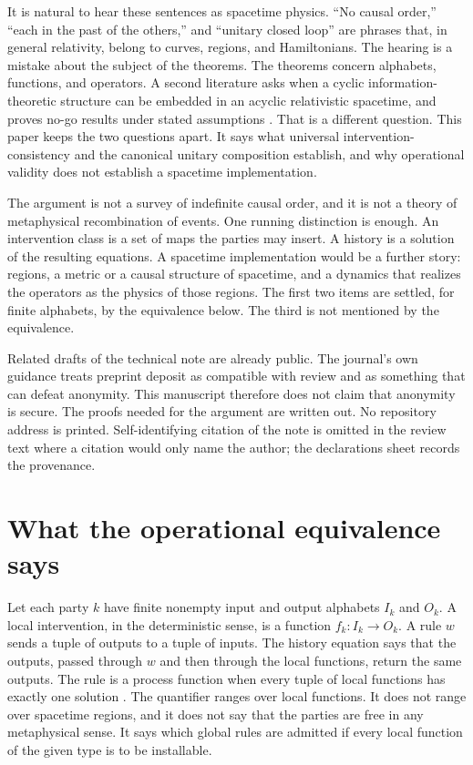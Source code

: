 \documentclass[11pt]{article}
\begin{document}
It is natural to hear these sentences as spacetime physics. ``No causal order,'' ``each in the past of the others,'' and ``unitary closed loop'' are phrases that, in general relativity, belong to curves, regions, and Hamiltonians. The hearing is a mistake about the subject of the theorems. The theorems concern alphabets, functions, and operators. A second literature asks when a cyclic information-theoretic structure can be embedded in an acyclic relativistic spacetime, and proves no-go results under stated assumptions \citep{vilasini2024}. That is a different question. This paper keeps the two questions apart. It says what universal intervention-consistency and the canonical unitary composition establish, and why operational validity does not establish a spacetime implementation.

The argument is not a survey of indefinite causal order, and it is not a theory of metaphysical recombination of events. One running distinction is enough. An intervention class is a set of maps the parties may insert. A history is a solution of the resulting equations. A spacetime implementation would be a further story: regions, a metric or a causal structure of spacetime, and a dynamics that realizes the operators as the physics of those regions. The first two items are settled, for finite alphabets, by the equivalence below. The third is not mentioned by the equivalence.

Related drafts of the technical note are already public. The journal's own guidance treats preprint deposit as compatible with review and as something that can defeat anonymity. This manuscript therefore does not claim that anonymity is secure. The proofs needed for the argument are written out. No repository address is printed. Self-identifying citation of the note is omitted in the review text where a citation would only name the author; the declarations sheet records the provenance.

\section{What the operational equivalence says}
\label{sec:op}

Let each party \(k\) have finite nonempty input and output alphabets \(I_k\) and \(O_k\). A local intervention, in the deterministic sense, is a function \(f_k\colon I_k\to O_k\). A rule \(w\) sends a tuple of outputs to a tuple of inputs. The history equation says that the outputs, passed through \(w\) and then through the local functions, return the same outputs. The rule is a process function when every tuple of local functions has exactly one solution \citep{baumeler2016}. The quantifier ranges over local functions. It does not range over spacetime regions, and it does not say that the parties are free in any metaphysical sense. It says which global rules are admitted if every local function of the given type is to be installable.
\end{document}
